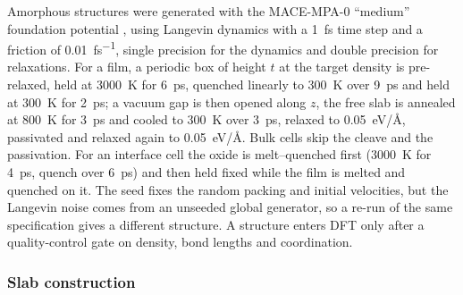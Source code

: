 Amorphous structures were generated with the MACE-MPA-0 ``medium'' foundation potential
, %
using Langevin dynamics with a \SI{1}{fs} time step and a friction of \SI{0.01}{fs^{-1}}, single precision for the
dynamics and double precision for relaxations. %
For a film, a periodic box of height $t$ at the target density is pre-relaxed, held at \SI{3000}{K} for \SI{6}{ps},
quenched linearly to \SI{300}{K} over \SI{9}{ps} and held at \SI{300}{K} for \SI{2}{ps}; a vacuum gap is then opened
along $z$, the free slab is annealed at \SI{800}{K} for \SI{3}{ps} and cooled to \SI{300}{K} over \SI{3}{ps}, relaxed
to \SI{0.05}{eV/\angstrom}, passivated and relaxed again to \SI{0.05}{eV/\angstrom}. %
Bulk cells skip the cleave and the passivation. %
For an interface cell the oxide is melt--quenched first (\SI{3000}{K} for \SI{4}{ps}, quench over \SI{6}{ps}) and then
held fixed while the film is melted and quenched on it. %
The seed fixes the random packing and initial velocities, but the Langevin noise comes from an unseeded global
generator, so a re-run of the same specification gives a different structure. %
A structure enters DFT only after a quality-control gate on density, bond lengths and coordination. %

\subsubsection{Slab construction}
\label{sec:m-dft-slabs}


